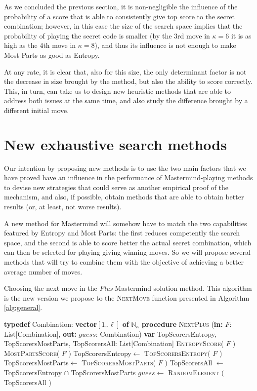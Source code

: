 \documentclass[preprint,12pt]{elsarticle}
\begin{document}
As we concluded the previous section, it is non-negligible the
influence of the probability of a score that is able to consistently
give top score to the secret combination; however, in this case the
size of the search space implies that the probability of playing the
secret code is smaller (by the 3rd move in $\kappa=6$ it is as high as
the 4th move in $\kappa=8$), and thus its influence is not enough to
make Most Parts as good as Entropy.

At any rate, it is clear that, also for this size, the only
determinant factor is not the decrease in size brought by the method,
but also the ability to score correctly. This, in turn, can take us to
design new heuristic methods that are able to address both issues at
the same time, and also study the difference brought by a different
initial move. 


\section{New exhaustive search methods}
\label{s:nsm}

Our intention by proposing new methods is to use the two main factors
that we have proved have an influence in the performance of
Mastermind-playing methods to devise new strategies that could serve
as another empirical proof of the mechanism, and also, if possible,
obtain methods that are able to obtain better results (or, at least,
not worse results).

A new method for Mastermind will somehow have to match the two
capabilities featured by Entropy and Most Parts: the first reduces
competently the search space, and the second is able to score better
the actual secret combination, which can then be selected for playing
giving winning moves. So we will propose several methods that will try
to combine them with the objective of achieving a better average
number of moves.
%
\begin{algorithm*}[htb!]
\caption{Choosing the next move in the {\em Plus} Mastermind solution
  method. This algorithm is the new version we propose to the
  \textsc{NextMove} function presented in Algorithm \ref{alg:general}.}\label{alg:plus}
\smallskip
\textbf{typedef} Combination: \textbf{vector}$[1..\ell]$ \textbf{of} $\mathbb{N}_\kappa$\;
\BlankLine
\textbf{procedure} \textsc{NextPlus} (\textbf{in:} $F$: List[Combination], \textbf{out:} $guess$: Combination)\;
\textbf{var} TopScorersEntropy, 
 TopScorersMostParts, 
 TopScorersAll: List[Combination]\; 
\textsc{EntropyScore}( $F$ )\;
\textsc{MostPartsScore}( $F$ )\;
TopScorersEntropy$\leftarrow$ \textsc{TopScorersEntropy}( $F$ )\;
TopScorersMostParts$\leftarrow$ \textsc{TopScorersMostParts}( $F$ )\;
TopScorersAll $\leftarrow$ TopScorersEntropy $\cap$ TopScorersMostParts\;
$guess\leftarrow$ \textsc{RandomElement} ( TopScorersAll )\;
\end{algorithm*}
\end{document}
